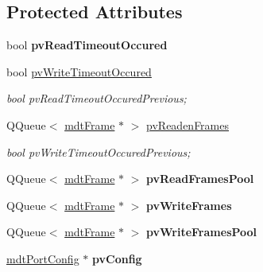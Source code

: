 \subsection*{Protected Attributes}
\begin{DoxyCompactItemize}
\item 
\hypertarget{classmdt_abstract_port_a9faa5966fcf4232b3d25034c0f67dd7c}{
bool {\bfseries pvReadTimeoutOccured}}
\label{classmdt_abstract_port_a9faa5966fcf4232b3d25034c0f67dd7c}

\item 
\hypertarget{classmdt_abstract_port_ae5a003d280237700c8aa3cb6184e2d1b}{
bool \hyperlink{classmdt_abstract_port_ae5a003d280237700c8aa3cb6184e2d1b}{pvWriteTimeoutOccured}}
\label{classmdt_abstract_port_ae5a003d280237700c8aa3cb6184e2d1b}

\begin{DoxyCompactList}\small\item\em bool pvReadTimeoutOccuredPrevious; \end{DoxyCompactList}\item 
\hypertarget{classmdt_abstract_port_a412c3e4903bf7d90914cfeb273e82623}{
QQueue$<$ \hyperlink{classmdt_frame}{mdtFrame} $\ast$ $>$ \hyperlink{classmdt_abstract_port_a412c3e4903bf7d90914cfeb273e82623}{pvReadenFrames}}
\label{classmdt_abstract_port_a412c3e4903bf7d90914cfeb273e82623}

\begin{DoxyCompactList}\small\item\em bool pvWriteTimeoutOccuredPrevious; \end{DoxyCompactList}\item 
\hypertarget{classmdt_abstract_port_a3d6bb9b420f64776d8fd077cf2b9b873}{
QQueue$<$ \hyperlink{classmdt_frame}{mdtFrame} $\ast$ $>$ {\bfseries pvReadFramesPool}}
\label{classmdt_abstract_port_a3d6bb9b420f64776d8fd077cf2b9b873}

\item 
\hypertarget{classmdt_abstract_port_a12cd5c1ba100b018539ed909a481d6dc}{
QQueue$<$ \hyperlink{classmdt_frame}{mdtFrame} $\ast$ $>$ {\bfseries pvWriteFrames}}
\label{classmdt_abstract_port_a12cd5c1ba100b018539ed909a481d6dc}

\item 
\hypertarget{classmdt_abstract_port_a67a8b1965f20a55ad115926aed0234b4}{
QQueue$<$ \hyperlink{classmdt_frame}{mdtFrame} $\ast$ $>$ {\bfseries pvWriteFramesPool}}
\label{classmdt_abstract_port_a67a8b1965f20a55ad115926aed0234b4}

\item 
\hypertarget{classmdt_abstract_port_a035d72bddbac47f405a8ecf0d2eeba66}{
\hyperlink{classmdt_port_config}{mdtPortConfig} $\ast$ {\bfseries pvConfig}}
\label{classmdt_abstract_port_a035d72bddbac47f405a8ecf0d2eeba66}


\end{DoxyCompactItemize}
